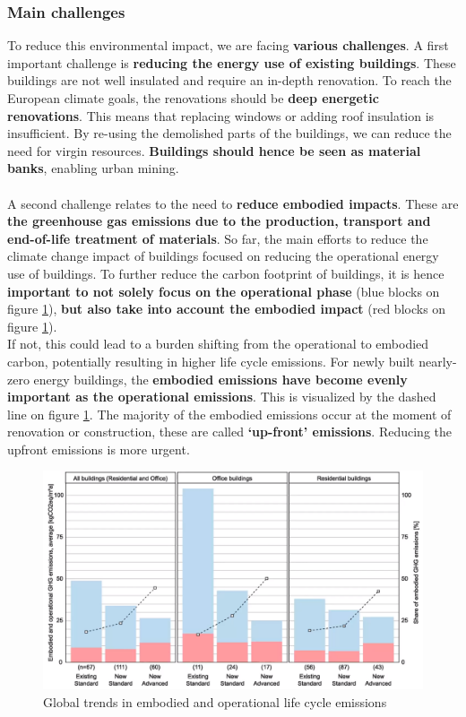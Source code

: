 \documentclass[../summary.tex]{subfiles}
\begin{document}
	\subsubsection{Main challenges}
	
	To reduce this environmental impact, we are facing \textbf{various challenges}. A first important challenge is \textbf{reducing the energy use of existing buildings}. These buildings are not well insulated and require an in-depth renovation. To reach the European climate goals, the renovations should be \textbf{deep energetic renovations}. This means that replacing windows or adding roof insulation is insufficient. By re-using the demolished parts of the buildings, we can reduce the need for virgin resources. \textbf{Buildings should hence be seen as material banks}, enabling urban mining.
	\\\\
	A second challenge relates to the need to \textbf{reduce embodied impacts}. These are \textbf{the greenhouse gas emissions due to the production, transport and end-of-life treatment of materials}. So far, the main efforts to reduce the climate change impact of buildings focused on reducing the operational energy use of buildings. To further reduce the carbon footprint of buildings, it is hence \textbf{important to not solely focus on the operational phase} (blue blocks on figure \ref{fig:8-embodied-operational-trends}), \textbf{but also take into account the embodied impact} (red blocks on figure \ref{fig:8-embodied-operational-trends}). \\
	If not, this could lead to a burden shifting from the operational to embodied carbon, potentially resulting in higher life cycle emissions. For newly built nearly-zero energy buildings, the \textbf{embodied emissions have become evenly important as the operational emissions}. This is visualized by the dashed line on figure \ref{fig:8-embodied-operational-trends}. The majority of the embodied emissions occur at the moment of renovation or construction, these are called \textbf{‘up-front’ emissions}. Reducing the upfront emissions is more urgent.
	
	\begin{figure}[H]
		\centering
		\includegraphics[width=0.7\linewidth]{../images/8-embodied-operational-trends.png}
		\caption{Global trends in embodied and operational life cycle emissions}
		\label{fig:8-embodied-operational-trends}
	\end{figure}
	
\end{document}
